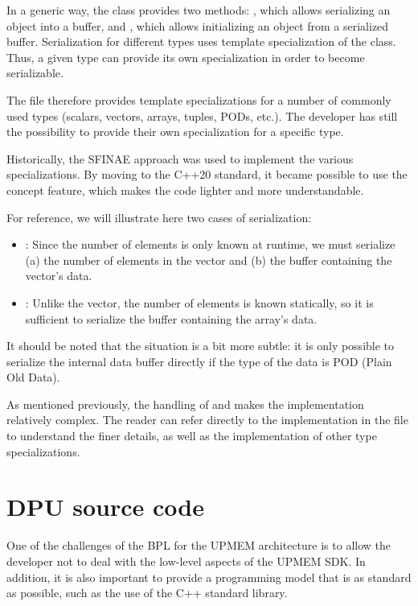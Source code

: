 In a generic way, the  class provides two methods: 
, which allows serializing an object into a buffer, 
and , which allows initializing an object from a serialized buffer.
Serialization for different types uses template specialization of the  class. 
Thus, a given type can provide its own specialization in order to become serializable.

The  file therefore provides template specializations for a number of commonly used types
(scalars, vectors, arrays, tuples, PODs, etc.).
The developer has still the possibility to provide their own specialization for a specific type.

Historically, the SFINAE approach was used to implement the various specializations. By moving to the C++20 standard, 
it became possible to use the concept feature, which makes the code lighter and more understandable.

For reference, we will illustrate here two cases of serialization:
\begin{itemize}
\item {}: Since the number of elements is only known at runtime, we must serialize 
(a) the number of elements in the vector and (b) the buffer containing the vector’s data.
\item {}: Unlike the vector, the number of elements is known statically, so it is sufficient 
to serialize the buffer containing the array’s data.
\end{itemize} 
		
It should be noted that the situation is a bit more subtle: it is only possible to serialize the internal data buffer 
directly if the type of the data is POD (Plain Old Data).

As mentioned previously, the handling of  and  makes the implementation relatively complex. 
The reader can refer directly to the implementation in the  file to understand the finer details, 
as well as the implementation of other type specializations.
 
\section{DPU source code}
One of the challenges of the BPL for the UPMEM architecture is to allow the developer not to deal with the low-level aspects 
of the UPMEM SDK. In addition, it is also important to provide a programming model that is as standard as possible, 
such as the use of the C++ standard library.

